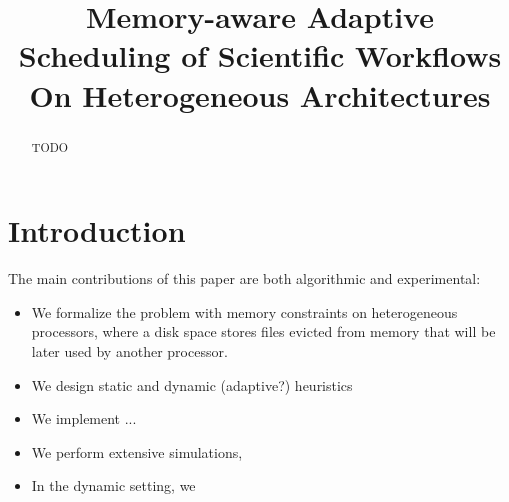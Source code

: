 \documentclass[conference]{IEEEtran}
\begin{document}
    \title{Memory-aware Adaptive Scheduling of Scientific Workflows On Heterogeneous Architectures\\
    }



    \maketitle

    \begin{abstract}

      TODO

    \end{abstract}


\section{Introduction}




    The main contributions of this paper are both algorithmic and experimental:
    \begin{itemize}
    \item We formalize the problem with memory constraints on heterogeneous processors, where a disk space
   stores files evicted from memory that will be later used by another processor.
    \item We design static and dynamic (adaptive?) heuristics
    \item We implement ...
    \item We perform extensive simulations,
    \item In the dynamic setting, we
    \end{itemize}
\end{document}
